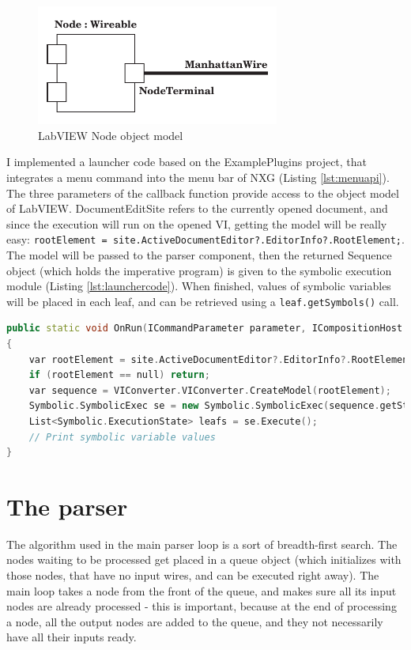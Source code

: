 \begin{figure}

\centering
\includegraphics[width=80mm,keepaspectratio]{figures/lvobject.pdf}
\caption{LabVIEW Node object model} 
\label{fig:lvobject}
\end{figure}
I implemented a launcher code based on the ExamplePlugins project, that integrates a menu command into the menu bar of NXG (Listing \ref{lst:menuapi}). The three parameters of the callback function provide access to the object model of LabVIEW. DocumentEditSite refers to the currently opened document, and since the execution will run on the opened VI, getting the model will be really easy: \lstinline[columns=fixed]{rootElement = site.ActiveDocumentEditor?.EditorInfo?.RootElement;}. The model will be passed to the parser component, then the returned Sequence object (which holds the imperative program) is given to the symbolic execution module (Listing \ref{lst:launchercode}). When finished, values of symbolic variables will be placed in each leaf, and can be retrieved using a \lstinline[columns=fixed]{leaf.getSymbols()} call.
\lstset{escapechar=@}
\begin{lstlisting}[frame=single,escapechar=@,float=!ht,caption={Launcher code},captionpos=b,label={lst:launchercode},language=C++]
public static void OnRun(ICommandParameter parameter, ICompositionHost host, DocumentEditSite site)
{
    var rootElement = site.ActiveDocumentEditor?.EditorInfo?.RootElement;
    if (rootElement == null) return;
    var sequence = VIConverter.VIConverter.CreateModel(rootElement);
    Symbolic.SymbolicExec se = new Symbolic.SymbolicExec(sequence.getStatements());
    List<Symbolic.ExecutionState> leafs = se.Execute();
    // Print symbolic variable values
}
\end{lstlisting}
\section{The parser}
The algorithm used in the main parser loop is a sort of breadth-first search. The nodes waiting to be processed get placed in a queue object (which initializes with those nodes, that have no input wires, and can be executed right away). The main loop takes a node from the front of the queue, and makes sure all its input nodes are already processed - this is important, because at the end of processing a node, all the output nodes are added to the queue, and they not necessarily have all their inputs ready. 

